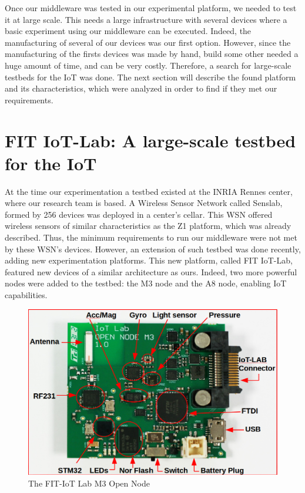 Once our middleware was tested in our experimental platform, we needed to test it at large scale.
This needs a large infrastructure with several devices where a basic experiment using our middleware can be executed.
Indeed, the manufacturing of several of our devices was our first option.
However, since the manufacturing of the firsts devices was made by hand, build some other needed a huge amount of time, and can be very costly.
Therefore, a search for large-scale testbeds for the IoT was done.
The next section will describe the found platform and its characteristics, which were analyzed in order to find if they met our requirements.

\section{FIT IoT-Lab: A large-scale testbed for the IoT}
At the time our experimentation a testbed existed at the INRIA Rennes center, where our research team is based.
A Wireless Sensor Network called Senslab\cite{des2011senslab}, formed by 256 devices was deployed in a center's cellar.
This WSN offered wireless sensors of similar characteristics as the Z1 platform, which was already described.
Thus, the minimum requirements to run our middleware were not met by these WSN's devices.
However, an extension of such testbed was done recently, adding new experimentation platforms.
This new platform, called FIT IoT-Lab\cite{Fleury15iotlab}, featured new devices of a similar architecture as ours.
Indeed, two more powerful nodes were added to the testbed: the M3 node and the A8 node, enabling IoT capabilities.

\begin{figure}[htb]
	\centering
	\includegraphics[width=0.7\columnwidth]{chapters/modelsAtRuntimeContiki.images/m3opennode.png}
	\caption{The FIT-IoT Lab M3 Open Node} \label{fig:M3OpenNode}
\end{figure}


